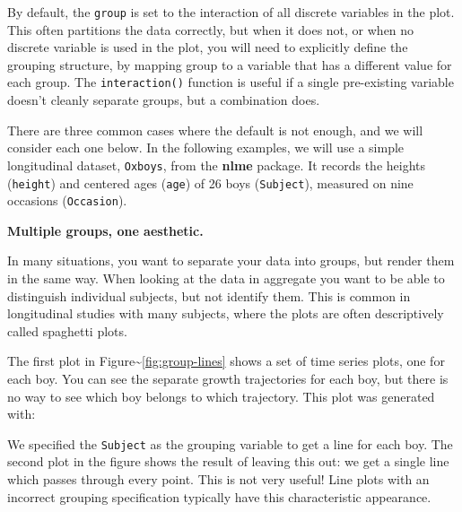 By default, the \texttt{group} is set to the interaction of all discrete
variables in the plot. This often partitions the data correctly, but
when it does not, or when no discrete variable is used in the plot, you
will need to explicitly define the grouping structure, by mapping group
to a variable that has a different value for each group. The
\texttt{interaction()} function is useful if a single pre-existing
variable doesn't cleanly separate groups, but a combination does.

There are three common cases where the default is not enough, and we
will consider each one below. In the following examples, we will use a
simple longitudinal dataset, \texttt{Oxboys}, from the \textbf{nlme}
package. It records the heights (\texttt{height}) and centered ages
(\texttt{age}) of 26 boys (\texttt{Subject}), measured on nine occasions
(\texttt{Occasion}). 

\textbf{Multiple groups, one aesthetic.}

In many situations, you want to separate your data into groups, but
render them in the same way. When looking at the data in aggregate you
want to be able to distinguish individual subjects, but not identify
them. This is common in longitudinal studies with many subjects, where
the plots are often descriptively called spaghetti plots.

The first plot in Figure\textasciitilde{}\ref{fig:group-lines} shows a
set of time series plots, one for each boy. You can see the separate
growth trajectories for each boy, but there is no way to see which boy
belongs to which trajectory. This plot was generated with:

\begin{Shaded}
\begin{Highlighting}[]
\StringTok{ } \StringTok{ }
\StringTok{  }\NormalTok{()}
\end{Highlighting}
\end{Shaded}

\noindent We specified the \texttt{Subject} as the grouping variable to
get a line for each boy. The second plot in the figure shows the result
of leaving this out: we get a single line which passes through every
point. This is not very useful! Line plots with an incorrect grouping
specification typically have this characteristic appearance.

